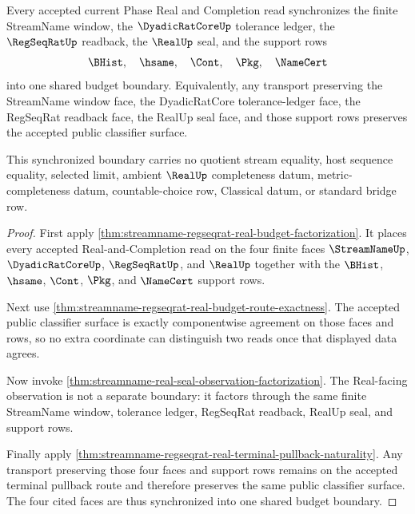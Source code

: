 \begin{theorem}
\label{thm:streamname-real-completion-budget-synchronization}
Every accepted current Phase Real and Completion read synchronizes the finite StreamName window, the $\DyadicRatCoreUp$ tolerance ledger, the $\RegSeqRatUp$ readback, the $\RealUp$ seal, and the support rows
$$
\BHist,\quad \hsame,\quad \Cont,\quad \Pkg,\quad \NameCert
$$
into one shared budget boundary. Equivalently, any transport preserving the StreamName window face, the DyadicRatCore tolerance-ledger face, the RegSeqRat readback face, the RealUp seal face, and those support rows preserves the accepted public classifier surface.

This synchronized boundary carries no quotient stream equality, host sequence equality, selected limit, ambient $\RealUp$ completeness datum, metric-completeness datum, countable-choice row, Classical datum, or standard bridge row.
\end{theorem}
\begin{proof}
First apply \autoref{thm:streamname-regseqrat-real-budget-factorization}. It places every accepted Real-and-Completion read on the four finite faces $\StreamNameUp$, $\DyadicRatCoreUp$, $\RegSeqRatUp$, and $\RealUp$ together with the $\BHist$, $\hsame$, $\Cont$, $\Pkg$, and $\NameCert$ support rows.

Next use \autoref{thm:streamname-regseqrat-real-budget-route-exactness}. The accepted public classifier surface is exactly componentwise agreement on those faces and rows, so no extra coordinate can distinguish two reads once that displayed data agrees.

Now invoke \autoref{thm:streamname-real-seal-observation-factorization}. The Real-facing observation is not a separate boundary: it factors through the same finite StreamName window, tolerance ledger, RegSeqRat readback, RealUp seal, and support rows.

Finally apply \autoref{thm:streamname-regseqrat-real-terminal-pullback-naturality}. Any transport preserving those four faces and support rows remains on the accepted terminal pullback route and therefore preserves the same public classifier surface. The four cited faces are thus synchronized into one shared budget boundary.
\end{proof}

